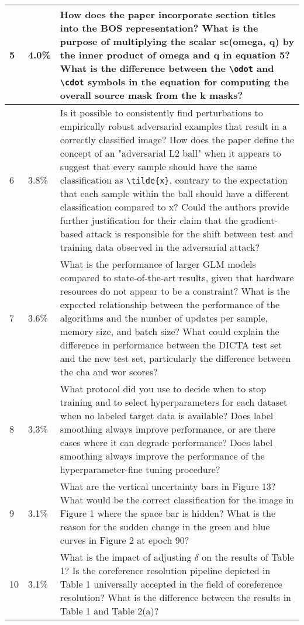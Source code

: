 \begin{table*}[!ht]
\begin{tabularx}{\textwidth}{p{0.2cm}p{0.7cm}X}
5 & 4.0\% & How does the paper incorporate section titles into the BOS representation? What is the purpose of multiplying the scalar sc(omega, q) by the inner product of omega and q in equation 5? What is the difference between the \verb|\odot| and \verb|\cdot| symbols in the equation for computing the overall source mask from the k masks? \\ \midrule
6 & 3.8\% & Is it possible to consistently find perturbations to empirically robust adversarial examples that result in a correctly classified image? How does the paper define the concept of an "adversarial L2 ball" when it appears to suggest that every sample should have the same classification as \verb|\tilde{x}|, contrary to the expectation that each sample within the ball should have a different classification compared to x? Could the authors provide further justification for their claim that the gradient-based attack is responsible for the shift between test and training data observed in the adversarial attack? \\ \midrule
7 & 3.6\% & What is the performance of larger GLM models compared to state-of-the-art results, given that hardware resources do not appear to be a constraint? What is the expected relationship between the performance of the algorithms and the number of updates per sample, memory size, and batch size? What could explain the difference in performance between the DICTA test set and the new test set, particularly the difference between the cha and wor scores? \\ \midrule
8 & 3.3\% & What protocol did you use to decide when to stop training and to select hyperparameters for each dataset when no labeled target data is available? Does label smoothing always improve performance, or are there cases where it can degrade performance? Does label smoothing always improve the performance of the hyperparameter-fine tuning procedure? \\ \midrule
9 & 3.1\% & What are the vertical uncertainty bars in Figure 13? What would be the correct classification for the image in Figure 1 where the space bar is hidden? What is the reason for the sudden change in the green and blue curves in Figure 2 at epoch 90? \\ \midrule
10 & 3.1\% & What is the impact of adjusting $\delta$ on the results of Table 1? Is the coreference resolution pipeline depicted in Table 1 universally accepted in the field of coreference resolution? What is the difference between the results in Table 1 and Table 2(a)? \\ \midrule

\end{tabularx}
\end{table*}
